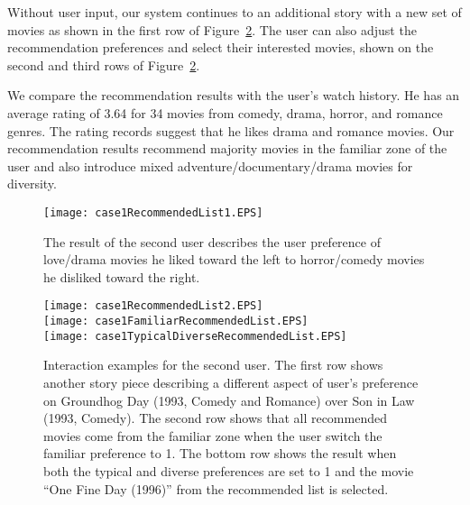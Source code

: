 \documentclass{vgtc}                          %
\begin{document}
Without user input, our system continues to an additional story with a new set of movies as shown in the first row of Figure~\ref{case1InteractionsResults}.
The user can also adjust the recommendation preferences and select their interested movies, shown on the second and third rows of Figure~\ref{case1InteractionsResults}.  

We compare the recommendation results with the user's watch history.
He has an average rating of 3.64 for 34 movies from comedy, drama, horror, and romance genres.
The rating records suggest that he likes drama and romance movies. 
Our recommendation results recommend majority movies in the familiar zone of the user and also introduce mixed adventure/documentary/drama movies for diversity.

\begin{figure}[htb]
\centering
\texttt{[image: case1RecommendedList1.EPS]}
\caption{The result of the second user describes the user preference of love/drama movies he liked toward the left to horror/comedy movies he disliked toward the right.}
\label{case1RecommendedList}
\end{figure}


\begin{figure}[htb]
\centering
\texttt{[image: case1RecommendedList2.EPS]}\\
\vspace{+1mm}
\texttt{[image: case1FamiliarRecommendedList.EPS]}\\
\vspace{+1mm}
\texttt{[image: case1TypicalDiverseRecommendedList.EPS]}
\caption{Interaction examples for the second user.
The first row shows another story piece describing a different aspect of user's preference on Groundhog Day (1993, Comedy and Romance) over Son in Law (1993, Comedy).
The second row shows that all recommended movies come from the familiar zone when the user switch the familiar preference to 1.
The bottom row shows the result when both the typical and diverse preferences are set to 1 and the movie ``One Fine Day (1996)'' from the recommended list is selected.
}
\label{case1InteractionsResults}
\end{figure}
\end{document}
